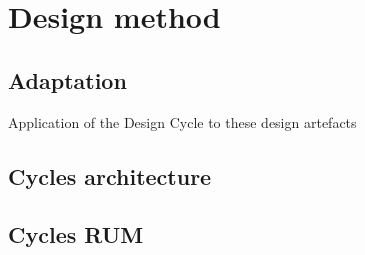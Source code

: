\chapter{Design method}
\section{Adaptation}
Application of the Design Cycle to these design artefacts
\section{Cycles architecture}
\section{Cycles RUM}
